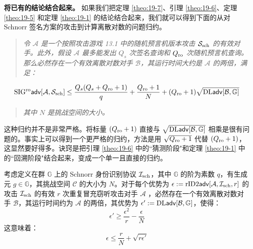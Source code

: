 \noindent
\textbf{将已有的结论结合起来。}
如果我们把定理 \ref{theo:19-7}、引理 \ref{theo:19-6}、定理 \ref{theo:19-5} 和定理 \ref{theo:19-1} 的结论结合起来，我们就可以得到下面的从对 Schnorr 签名方案的攻击到计算离散对数的问题归约。

\begin{quote}
\emph{令 $\mathcal{A}$ 是一个按照攻击游戏 13.1 中的随机预言机版本攻击 $\mathcal{S}_{\rm sch}$ 的有效对手。此外，假设 $\mathcal{A}$ 最多能发出 $Q_s$ 次签名查询和 $Q_{\rm ro}$ 次随机预言机查询。那么必然存在一个有效离散对数对手 $\mathcal{B}$，其运行时间大约是 $\mathcal{A}$ 的两倍，满足：}
\end{quote}
\begin{equation}\label{eq:19-6}
{\rm SIG^{ro}\mathsf{adv}}[\mathcal{A},\mathcal{S}_{\rm sch}]\leq\frac{Q_s(Q_s+Q_{\rm ro}+1)}{q}+\frac{Q_{\rm ro}+1}{N}+(Q_{\rm ro}+1)\sqrt{{\rm DL\mathsf{adv}}[\mathcal{B},\mathbb{G}]}
\end{equation}
\begin{quote}
\emph{其中 $N$ 是挑战空间的大小。}
\end{quote}

这种归约并不是非常严格。将标量 $(Q_{\rm ro}+1)$ 直接与 $\sqrt{{\rm DL\mathsf{adv}}[\mathcal{B},\mathbb{G}]}$ 相乘是很有问题的。事实上可以得到一个更严格的归约，方法是用 $\sqrt{Q_{\rm ro}+1}$ 代替 $(Q_{\rm ro}+1)$，这显然要好得多。诀窍是把引理 \ref{theo:19-6} 中的``猜测阶段"和定理 \ref{theo:19-1} 中的``回溯阶段"结合起来，变成一个单一且直接的归约。

\begin{lemma}\label{theo:19-8}
考虑定义在群 $\mathbb{G}$ 上的 Schnorr 身份识别协议 $\mathcal{I}_{\rm sch}$，其中 $\mathbb{G}$ 的阶为素数 $q$，有生成元 $g\in\mathbb{G}$，其挑战空间 $\mathcal{C}$ 的大小为 $N$。对于每个优势为 $\epsilon:={\rm rID2\mathsf{adv}}[\mathcal{A},\mathcal{I}_{\rm sch},r]$ 的攻击 $\mathcal{I}_{\rm sch}$ 的有效 $r$ 次重复冒充窃听攻击对手 $\mathcal{A}$ ，必然存在一个有效离散对数对手 $\mathcal{B}$，其运行时间约为 $\mathcal{A}$ 的两倍，其优势为 $\epsilon':={\rm DL\mathsf{adv}}[\mathcal{B},\mathbb{G}]$，使得：
\begin{equation}\label{eq:19-7}
\epsilon'\geq\frac{\epsilon^2}{r}-\frac{\epsilon}{N}
\end{equation}
这意味着：
\begin{equation}\label{eq:19-8}
\epsilon\leq\frac{r}{N}+\sqrt{r\epsilon'}
\end{equation}
\end{lemma}

